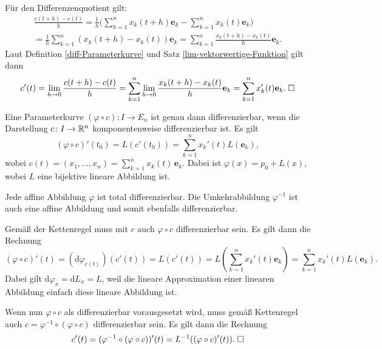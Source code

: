 \noindent{}
Für den Differenzenquotient gilt:
\begin{gather}
\frac{c(t+h)-c(t)}{h}
= \frac{1}{h}\bigg(\sum_{k=1}^n x_k(t+h)\mathbf e_k-\sum_{k=1}^n x_k(t)\mathbf e_k\bigg)\\
= \frac{1}{h}\sum_{k=1}^n (x_k(t+h)-x_k(t))\mathbf e_k
= \sum_{k=1}^n \frac{x_k(t+h)-x_k(t)}{h}\mathbf e_k.
\end{gather}
Laut Definition \ref{diff-Parameterkurve} und
Satz \ref{lim-vektorwertige-Funktion} gilt dann
\begin{equation}
c'(t) = \lim_{h\to 0}\frac{c(t+h)-c(t)}{h}
= \sum_{k=1}^n \lim_{h\to 0}\frac{x_k(t+h)-x_k(t)}{h}\mathbf e_k
= \sum_{k=1}^n x_k'(t)\mathbf e_k.\;\Box
\end{equation}

\begin{theorem}
Eine Parameterkurve $(\varphi\circ c)\colon I\to E_n$ ist genau dann
differenzierbar, wenn die Darstellung $c\colon I\to\mathbb R^n$
komponentenweise differenzierbar ist. Es gilt
\begin{equation}
(\varphi\circ c)'(t_0) = L(c'(t_0))
= \sum_{k=1}^n x_k'(t) L(\mathbf e_k),
\end{equation}
wobei $c(t) = (x_1,\ldots,x_n) = \sum_{k=1}^n x_k(t)\,\mathbf e_k$.
Dabei ist $\varphi(x) = p_0+L(x)$, wobei $L$ eine bijektive lineare
Abbildung ist.
\end{theorem}

\noindent{}
Jede affine Abbildung $\varphi$ ist total differenzierbar. Die
Umkehrabbildung $\varphi^{-1}$ ist auch eine affine Abbildung und
somit ebenfalls differenzierbar.

Gemäß der Kettenregel muss mit $c$ auch $\varphi\circ c$
differenzierbar sein. Es gilt dann die Rechnung%
\begin{equation}
(\varphi\circ c)'(t) = (\mathrm d\varphi_{c(t)})(c'(t))
= L(c'(t)) = L(\sum_{k=1}^n x_k'(t)\mathbf e_k)
= \sum_{k=1}^n x_k'(t)L(\mathbf e_k).
\end{equation}
Dabei gilt $\mathrm d\varphi_x = \mathrm dL_x = L$, weil die lineare
Approximation einer linearen Abbildung einfach diese lineare Abbildung
ist.

Wenn nun $\varphi\circ c$ als differenzierbar vorausgesetzt wird,
muss gemäß Kettenregel auch $c=\varphi^{-1}\circ(\varphi\circ c)$
differenzierbar sein. Es gilt dann die Rechnung
\begin{equation}
c'(t) = (\varphi^{-1}\circ(\varphi\circ c))'(t)
= L^{-1}((\varphi\circ c)'(t)).\;\Box
\end{equation}

